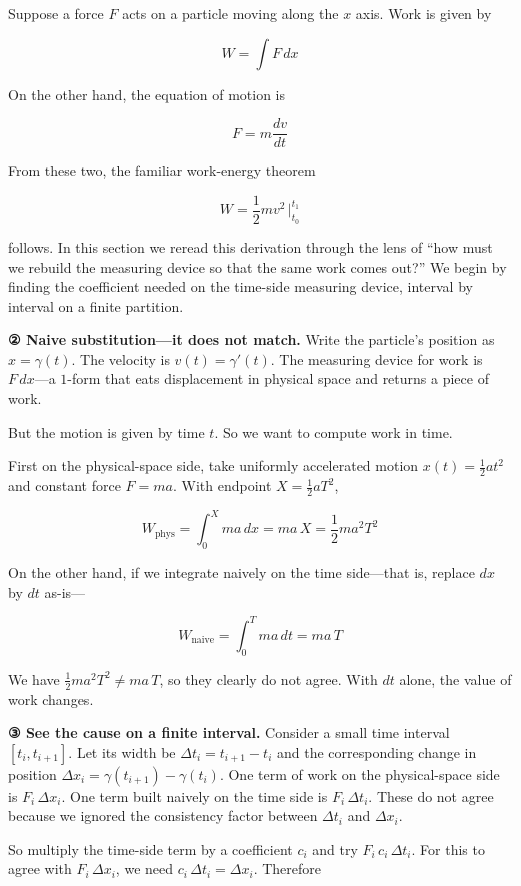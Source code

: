 \documentclass[a4paper,12pt,openany]{book}
\begin{document}
Suppose a force \(F\) acts on a particle moving along the \(x\) axis.
Work is given by

\[W = \int F\,dx\]

On the other hand, the equation of motion is

\[F = m\frac{dv}{dt}\]

From these two, the familiar work-energy theorem

\[W = \frac{1}{2}mv^2\,\Big|_{t_0}^{t_1}\]

follows. In this section we reread this derivation through the lens of
``how must we rebuild the measuring device so that the same work comes
out?'' We begin by finding the coefficient needed on the time-side
measuring device, interval by interval on a finite partition.

\textbf{② Naive substitution—it does not match.} Write the particle's
position as \(x = \gamma(t)\). The velocity is \(v(t)=\gamma'(t)\). The
measuring device for work is \(F\,dx\)—a \(1\)-form that eats
displacement in physical space and returns a piece of work.

But the motion is given by time \(t\). So we want to compute work in
time.

First on the physical-space side, take uniformly accelerated motion
\(x(t) = \frac{1}{2}at^2\) and constant force \(F = ma\). With endpoint
\(X = \frac{1}{2}aT^2\),

\[W_{\text{phys}} = \int_0^X ma\,dx = ma\,X = \frac{1}{2}ma^2T^2\]

On the other hand, if we integrate naively on the time side—that is,
replace \(dx\) by \(dt\) as-is—

\[W_{\text{naive}} = \int_0^T ma\,dt = ma\,T\]

We have \(\frac{1}{2}ma^2T^2 \neq ma\,T\), so they clearly do not agree.
With \(dt\) alone, the value of work changes.

\textbf{③ See the cause on a finite interval.} Consider a small time
interval \([t_i, t_{i+1}]\). Let its width be
\(\Delta t_i = t_{i+1} - t_i\) and the corresponding change in position
\(\Delta x_i = \gamma(t_{i+1}) - \gamma(t_i)\). One term of work on the
physical-space side is \(F_i\,\Delta x_i\). One term built naively on
the time side is \(F_i\,\Delta t_i\). These do not agree because we
ignored the consistency factor between \(\Delta t_i\) and
\(\Delta x_i\).

So multiply the time-side term by a coefficient \(c_i\) and try
\(F_i\,c_i\,\Delta t_i\). For this to agree with \(F_i\,\Delta x_i\), we
need \(c_i\,\Delta t_i = \Delta x_i\). Therefore
\end{document}
